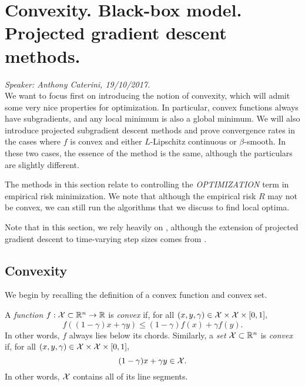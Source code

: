 
\section{Convexity. Black-box model. Projected gradient descent methods.}
\emph{Speaker: Anthony Caterini, 19/10/2017.}\\

We want to focus first on introducing the notion of convexity, which will admit some very nice properties for optimization. In particular, convex functions always have subgradients, and any local minimum is also a global minimum. We will also introduce projected subgradient descent methods and prove convergence rates in the cases where $f$ is convex and either $L$-Lipschitz continuous or $\beta$-smooth. In these two cases, the essence of the method is the same, although the particulars are slightly different.

The methods in this section relate to controlling the \emph{OPTIMIZATION} term in empirical risk minimization. We note that although the empirical risk $R$ may not be convex, we can still run the algorithms that we discuss to find local optima.

Note that in this section, we rely heavily on \cite{bubeck}, although the extension of projected gradient descent to time-varying step sizes comes from \cite[Lecture~11,~Page~5]{rigollet}.

\subsection{Convexity}

We begin by recalling the definition of a convex function and convex set.

\begin{definition}
A \emph{function} $f : \mathcal{X} \subset \mathbb{R}^n \rightarrow \mathbb{R}$ is \emph{convex} if, for all $(x, y, \gamma) \in \mathcal{X} \times \mathcal{X} \times [0,1],$
\[
f( (1 - \gamma) x + \gamma y ) \leq (1 - \gamma) f(x) + \gamma f(y).
\]
In other words, $f$ always lies below its chords. Similarly, a \emph{set} $\mathcal{X} \subset \mathbb{R}^n$ is \emph{convex} if, for all $(x, y, \gamma) \in \mathcal{X} \times \mathcal{X} \times [0,1],$
\[
(1 - \gamma) x + \gamma y \in \mathcal{X}.
\]
In other words, $\mathcal{X}$ contains all of its line segments.
\end{definition}

